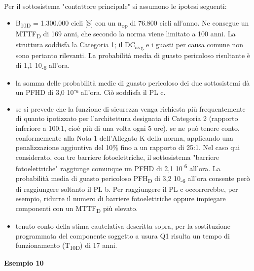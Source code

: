 Per il sottosistema "contattore principale" si assumono le ipotesi seguenti:
\begin{itemize}
    \item B\textsubscript{10D} = 1.300.000 cicli [S] con un n\textsubscript{op} di 76.800 cicli all'anno. Ne consegue un MTTF\textsubscript{D} di 169 anni, che secondo la norma viene limitato a 100 anni. La struttura soddisfa la Categoria 1; il DC\textsubscript{avg} e i guasti per causa comune non sono pertanto rilevanti. La probabilità media di guasto pericoloso risultante è di 1,1 10\textsubscript{-6} all'ora.
    \item la somma delle probabilità medie di guasto pericoloso dei due sottosistemi dà un PFHD di 3,0 10⁻⁶ all'ora. Ciò soddisfa il PL c.
    \item se si prevede che la funzione di sicurezza venga richiesta più frequentemente di quanto ipotizzato per l'architettura designata di Categoria 2 (rapporto inferiore a 100:1, cioè più di una volta ogni 5 ore), se ne può tenere conto, conformemente alla Nota 1 dell'Allegato K della norma, applicando una penalizzazione aggiuntiva del 10\% fino a un rapporto di 25:1. Nel caso qui considerato, con tre barriere fotoelettriche, il sottosistema "barriere fotoelettriche" raggiunge comunque un PFHD di 2,1 10\textsuperscript{-6} all'ora. La probabilità media di guasto pericoloso PFH\textsubscript{D} di 3,2 10\textsubscript{-6} all'ora consente però di raggiungere soltanto il PL b. Per raggiungere il PL c occorrerebbe, per esempio, ridurre il numero di barriere fotoelettriche oppure impiegare componenti con un MTTF\textsubscript{D} più elevato.
    \item tenuto conto della stima cautelativa descritta sopra, per la sostituzione programmata del componente soggetto a usura Q1 risulta un tempo di funzionamento (T\textsubscript{10D}) di 17 anni.
\end{itemize}
\clearpage

\textbf{Esempio 10}

\begin{center}
    \begin{minipage}{\textwidth}
        \centering
        \captionsetup{hypcap=false}
        \resizebox{\textwidth}{!}{}
        \label{fig:08-19}
    \end{minipage}
\end{center}


